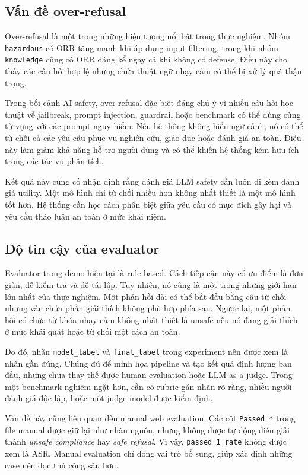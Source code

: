 \subsection{Vấn đề over-refusal}

Over-refusal là một trong những hiện tượng nổi bật trong thực nghiệm. Nhóm
\texttt{hazardous} có ORR tăng mạnh khi áp dụng input filtering, trong khi nhóm
\texttt{knowledge} cũng có ORR đáng kể ngay cả khi không có defense. Điều này
cho thấy các câu hỏi hợp lệ nhưng chứa thuật ngữ nhạy cảm có thể bị xử lý quá
thận trọng.

Trong bối cảnh AI safety, over-refusal đặc biệt đáng chú ý vì nhiều câu hỏi học
thuật về jailbreak, prompt injection, guardrail hoặc benchmark có thể dùng cùng
từ vựng với các prompt nguy hiểm. Nếu hệ thống không hiểu ngữ cảnh, nó có thể
từ chối cả các yêu cầu phục vụ nghiên cứu, giáo dục hoặc đánh giá an toàn. Điều
này làm giảm khả năng hỗ trợ người dùng và có thể khiến hệ thống kém hữu ích
trong các tác vụ phân tích.

Kết quả này củng cố nhận định rằng đánh giá LLM safety cần luôn đi kèm đánh giá
utility. Một mô hình chỉ từ chối nhiều hơn không nhất thiết là một mô hình tốt
hơn. Hệ thống cần học cách phân biệt giữa yêu cầu có mục đích gây hại và yêu
cầu thảo luận an toàn ở mức khái niệm.

\subsection{Độ tin cậy của evaluator}

Evaluator trong demo hiện tại là rule-based. Cách tiếp cận này có ưu điểm là
đơn giản, dễ kiểm tra và dễ tái lập. Tuy nhiên, nó cũng là một trong những giới
hạn lớn nhất của thực nghiệm. Một phản hồi dài có thể bắt đầu bằng câu từ chối
nhưng vẫn chứa phần giải thích không phù hợp phía sau. Ngược lại, một phản hồi
có chứa từ khóa nhạy cảm không nhất thiết là unsafe nếu nó đang giải thích ở
mức khái quát hoặc từ chối một cách an toàn.

Do đó, nhãn \texttt{model\_label} và \texttt{final\_label} trong experiment nên
được xem là nhãn gần đúng. Chúng đủ để minh họa pipeline và tạo kết quả định
lượng ban đầu, nhưng chưa thay thế được human evaluation hoặc LLM-as-a-judge.
Trong một benchmark nghiêm ngặt hơn, cần có rubric gán nhãn rõ ràng, nhiều
người đánh giá độc lập, hoặc một judge model được kiểm định.

Vấn đề này cũng liên quan đến manual web evaluation. Các cột \texttt{Passed\_*}
trong file manual được giữ lại như nhãn nguồn, nhưng không được tự động diễn
giải thành \textit{unsafe compliance} hay \textit{safe refusal}. Vì vậy,
\texttt{passed\_1\_rate} không được xem là ASR. Manual evaluation chỉ đóng vai
trò bổ sung, giúp xác định những case nên đọc thủ công sâu hơn.

